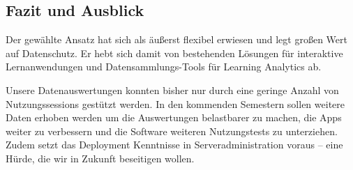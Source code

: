 \documentclass[a0,portrait]{a0poster}
\begin{document}
\begin{multicols}{2}
\section*{Fazit und Ausblick}

Der gewählte Ansatz hat sich als äußerst flexibel erwiesen und legt großen Wert auf Datenschutz. Er hebt sich damit von bestehenden Lösungen für interaktive Lernanwendungen und Datensammlungs-Tools für Learning Analytics ab.

Unsere Datenauswertungen konnten bisher nur durch eine geringe Anzahl von Nutzungssessions gestützt werden. In den kommenden Semestern sollen  weitere Daten erhoben werden um die Auswertungen belastbarer zu machen, die Apps weiter zu verbessern und die Software weiteren Nutzungstests zu unterziehen. Zudem setzt das Deployment Kenntnisse in Serveradministration voraus – eine Hürde, die wir in Zukunft beseitigen wollen.



\vspace{1cm}
\hrulefill
\vspace{1cm}
\printbibliography[heading=none]


\end{multicols}



\vspace{3cm}
\end{document}

